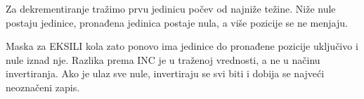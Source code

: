 Za dekrementiranje tražimo prvu jedinicu počev od najniže težine. Niže nule postaju jedinice, pronađena jedinica postaje nula, a više pozicije se ne menjaju.

Maska za EKSILI kola zato ponovo ima jedinice do pronađene pozicije uključivo i nule iznad nje. Razlika prema INC je u traženoj vrednosti, a ne u načinu invertiranja. Ako je ulaz sve nule, invertiraju se svi biti i dobija se najveći neoznačeni zapis.
